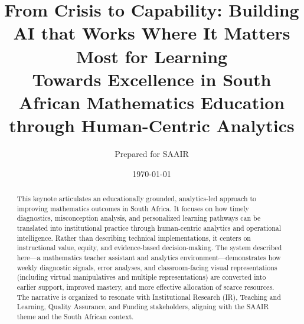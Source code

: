 \documentclass[12pt]{article}
\title{From Crisis to Capability: Building AI that Works Where It Matters Most for Learning\\\large Towards Excellence in South African Mathematics Education through Human-Centric Analytics}
\author{Prepared for SAAIR}
\date{\today}
\begin{document}
\maketitle
\begin{abstract}
This keynote articulates an educationally grounded, analytics-led approach to improving mathematics outcomes in South Africa. It focuses on how timely diagnostics, misconception analysis, and personalized learning pathways can be translated into institutional practice through human-centric analytics and operational intelligence. Rather than describing technical implementations, it centers on instructional value, equity, and evidence-based decision-making. The system described here---a mathematics teacher assistant and analytics environment---demonstrates how weekly diagnostic signals, error analyses, and classroom-facing visual representations (including virtual manipulatives and multiple representations) are converted into earlier support, improved mastery, and more effective allocation of scarce resources. The narrative is organized to resonate with Institutional Research (IR), Teaching and Learning, Quality Assurance, and Funding stakeholders, aligning with the SAAIR theme and the South African context.
\end{abstract}

\tableofcontents
\newpage











\end{document}
